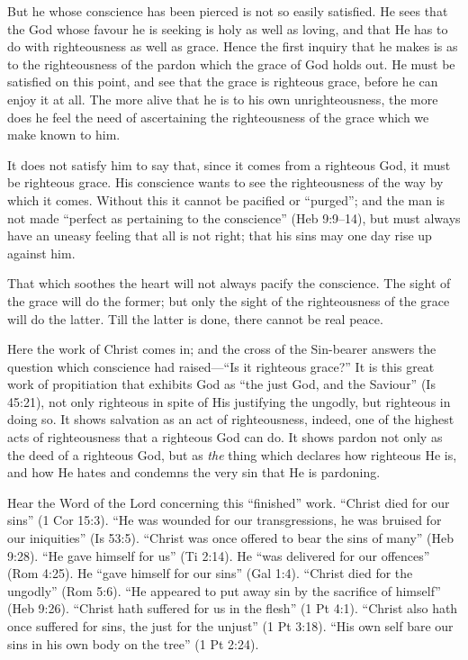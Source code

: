 \documentclass[
]{book}
\begin{document}
But he whose conscience has been pierced is not so easily satisfied. He sees that the God whose favour he is seeking is holy as well as loving, and that He has to do with righteousness as well as grace. Hence the first inquiry that he makes is as to the righteousness of the pardon which the grace of God holds out. He must be satisfied on this point, and see that the grace is righteous grace, before he can enjoy it at all. The more alive that he is to his own unrighteousness, the more does he feel the need of ascertaining the righteousness of the grace which we make known to him.

It does not satisfy him to say that, since it comes from a righteous God, it must be righteous grace. His conscience wants to see the righteousness of the way by which it comes. Without this it cannot be pacified or ``purged''; and the man is not made ``perfect as pertaining to the conscience'' (Heb 9:9--14), but must always have an uneasy feeling that all is not right; that his sins may one day rise up against him.

That which soothes the heart will not always pacify the conscience. The sight of the grace will do the former; but only the sight of the righteousness of the grace will do the latter. Till the latter is done, there cannot be real peace.

Here the work of Christ comes in; and the cross of the Sin-bearer answers the question which conscience had raised---``Is it righteous grace?'' It is this great work of propitiation that exhibits God as ``the just God, and the Saviour'' (Is 45:21), not only righteous in spite of His justifying the ungodly, but righteous in doing so. It shows salvation as an act of righteousness, indeed, one of the highest acts of righteousness that a righteous God can do. It shows pardon not only as the deed of a righteous God, but as \emph{the} thing which declares how righteous He is, and how He hates and condemns the very sin that He is pardoning.

Hear the Word of the Lord concerning this ``finished'' work. ``Christ died for our sins'' (1 Cor 15:3). ``He was wounded for our transgressions, he was bruised for our iniquities'' (Is 53:5). ``Christ was once offered to bear the sins of many'' (Heb 9:28). ``He gave himself for us'' (Ti 2:14). He ``was delivered for our offences'' (Rom 4:25). He ``gave himself for our sins'' (Gal 1:4). ``Christ died for the ungodly'' (Rom 5:6). ``He appeared to put away sin by the sacrifice of himself'' (Heb 9:26). ``Christ hath suffered for us in the flesh'' (1 Pt 4:1). ``Christ also hath once suffered for sins, the just for the unjust'' (1 Pt 3:18). ``His own self bare our sins in his own body on the tree'' (1 Pt 2:24).
\end{document}
